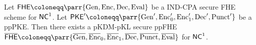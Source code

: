 \begin{lemma}
    Let \(\FHE \coloneqq \parr{\Gen, \Enc, \Dec, \Eval}\) be a IND-CPA secure FHE scheme for \(\mathsf{NC}^1\).
    Let \(\PKE' \coloneqq \parr{\Gen', \Enc'_0, \Enc'_1, \Dec', \Punct'}\) be a ppPKE.
    Then there exists a pKDM-pKL secure ppFHE \(\overline{\FHE} \coloneqq \parr{\overline{\Gen}, \overline{\Enc}_0, \overline{\Enc}_1, \overline{\Dec}, \overline{\Punct}, \overline{\Eval}}\) for \(\mathsf{NC}^1\).
\end{lemma}